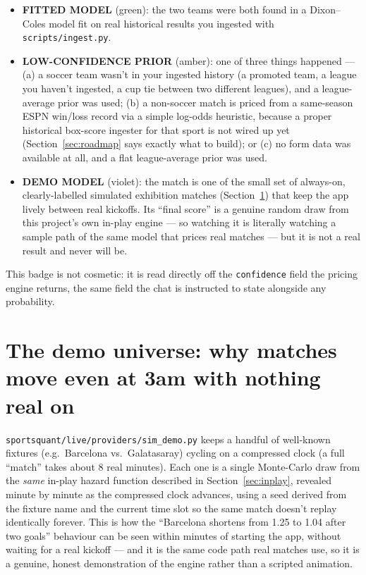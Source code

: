 \documentclass[11pt]{article}
\begin{document}
\begin{itemize}
\item \textbf{FITTED MODEL} (green): the two teams were both found in a Dixon--Coles model fit on
real historical results you ingested with \texttt{scripts/ingest.py}.
\item \textbf{LOW-CONFIDENCE PRIOR} (amber): one of three things happened --- (a) a soccer team
wasn't in your ingested history (a promoted team, a league you haven't ingested, a cup tie between
two different leagues), and a league-average prior was used; (b) a non-soccer match is priced from
a same-season ESPN win/loss record via a simple log-odds heuristic, because a proper historical
box-score ingester for that sport is not wired up yet (Section~\ref{sec:roadmap} says exactly what
to build); or (c) no form data was available at all, and a flat league-average prior was used.
\item \textbf{DEMO MODEL} (violet): the match is one of the small set of always-on, clearly-labelled
simulated exhibition matches (Section~\ref{sec:demo}) that keep the app lively between real
kickoffs. Its ``final score'' is a genuine random draw from this project's own in-play engine ---
so watching it is literally watching a sample path of the same model that prices real matches ---
but it is not a real result and never will be.
\end{itemize}
This badge is not cosmetic: it is read directly off the \texttt{confidence} field the pricing
engine returns, the same field the chat is instructed to state alongside any probability.

\section{The demo universe: why matches move even at 3am with nothing real on}
\label{sec:demo}
\texttt{sportsquant/live/providers/sim\_demo.py} keeps a handful of well-known fixtures (e.g.\
Barcelona vs.\ Galatasaray) cycling on a compressed clock (a full ``match'' takes about 8 real
minutes). Each one is a single Monte-Carlo draw from the \emph{same} in-play hazard function
described in Section~\ref{sec:inplay}, revealed minute by minute as the compressed clock advances,
using a seed derived from the fixture name and the current time slot so the same match doesn't
replay identically forever. This is how the ``Barcelona shortens from 1.25 to 1.04 after two
goals'' behaviour can be seen within minutes of starting the app, without waiting for a real
kickoff --- and it is the same code path real matches use, so it is a genuine, honest
demonstration of the engine rather than a scripted animation.
\end{document}
